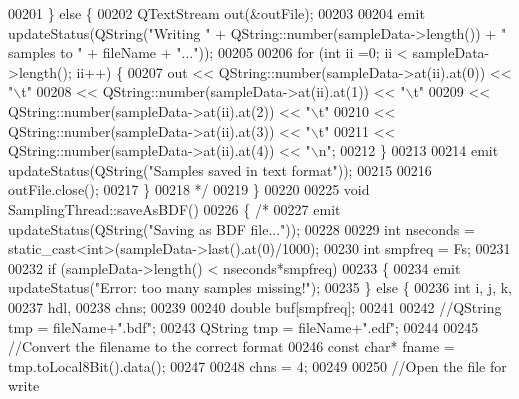 \begin{DoxyCode}
00201 \textcolor{comment}{    \} else \{}
00202 \textcolor{comment}{        QTextStream out(&outFile);}
00203 \textcolor{comment}{}
00204 \textcolor{comment}{        emit updateStatus(QString("Writing " + QString::number(sampleData->length()) + " samples to " +
       fileName + "..."));}
00205 \textcolor{comment}{}
00206 \textcolor{comment}{        for (int ii =0; ii < sampleData->length(); ii++) \{}
00207 \textcolor{comment}{            out << QString::number(sampleData->at(ii).at(0)) << "\(\backslash\)t"}
00208 \textcolor{comment}{                << QString::number(sampleData->at(ii).at(1)) << "\(\backslash\)t"}
00209 \textcolor{comment}{                << QString::number(sampleData->at(ii).at(2)) << "\(\backslash\)t"}
00210 \textcolor{comment}{                << QString::number(sampleData->at(ii).at(3)) << "\(\backslash\)t"}
00211 \textcolor{comment}{                << QString::number(sampleData->at(ii).at(4)) << "\(\backslash\)n";}
00212 \textcolor{comment}{        \}}
00213 \textcolor{comment}{}
00214 \textcolor{comment}{        emit updateStatus(QString("Samples saved in text format"));}
00215 \textcolor{comment}{}
00216 \textcolor{comment}{        outFile.close();}
00217 \textcolor{comment}{    \}}
00218 \textcolor{comment}{     */}
00219 \}
00220 
00225 \textcolor{keywordtype}{void} SamplingThread::saveAsBDF()
00226 \{ \textcolor{comment}{/*}
00227 \textcolor{comment}{    emit updateStatus(QString("Saving as BDF file..."));}
00228 \textcolor{comment}{}
00229 \textcolor{comment}{    int nseconds = static\_cast<int>(sampleData->last().at(0)/1000);}
00230 \textcolor{comment}{    int smpfreq = Fs;}
00231 \textcolor{comment}{}
00232 \textcolor{comment}{    if (sampleData->length() < nseconds*smpfreq)}
00233 \textcolor{comment}{    \{}
00234 \textcolor{comment}{        emit updateStatus("Error: too many samples missing!");}
00235 \textcolor{comment}{    \} else \{}
00236 \textcolor{comment}{        int i, j, k,}
00237 \textcolor{comment}{                hdl,}
00238 \textcolor{comment}{                chns;}
00239 \textcolor{comment}{}
00240 \textcolor{comment}{        double buf[smpfreq];}
00241 \textcolor{comment}{}
00242 \textcolor{comment}{        //QString tmp = fileName+".bdf";}
00243 \textcolor{comment}{        QString tmp = fileName+".edf";}
00244 \textcolor{comment}{}
00245 \textcolor{comment}{        //Convert the filename to the correct format}
00246 \textcolor{comment}{        const char* fname = tmp.toLocal8Bit().data();}
00247 \textcolor{comment}{}
00248 \textcolor{comment}{        chns = 4;}
00249 \textcolor{comment}{}
00250 \textcolor{comment}{        //Open the file for write}

\end{DoxyCode}
